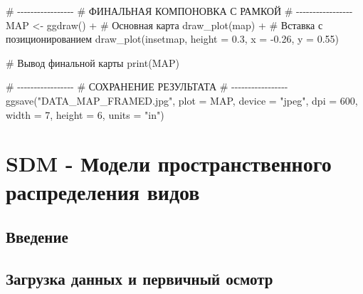 \documentclass[
  letterpaper,
  DIV=11,
  numbers=noendperiod]{scrreprt}
\newenvironment{Shaded}{\begin{snugshade}}{\end{snugshade}}
\newcommand{\AttributeTok}[1]{\textcolor[rgb]{0.40,0.45,0.13}{#1}}
\newcommand{\CommentTok}[1]{\textcolor[rgb]{0.37,0.37,0.37}{#1}}
\newcommand{\DecValTok}[1]{\textcolor[rgb]{0.68,0.00,0.00}{#1}}
\newcommand{\FloatTok}[1]{\textcolor[rgb]{0.68,0.00,0.00}{#1}}
\newcommand{\FunctionTok}[1]{\textcolor[rgb]{0.28,0.35,0.67}{#1}}
\newcommand{\NormalTok}[1]{\textcolor[rgb]{0.00,0.23,0.31}{#1}}
\newcommand{\OtherTok}[1]{\textcolor[rgb]{0.00,0.23,0.31}{#1}}
\newcommand{\SpecialCharTok}[1]{\textcolor[rgb]{0.37,0.37,0.37}{#1}}
\newcommand{\StringTok}[1]{\textcolor[rgb]{0.13,0.47,0.30}{#1}}
\begin{document}
\begin{Shaded}
\begin{Highlighting}[]
\CommentTok{\# {-}{-}{-}{-}{-}{-}{-}{-}{-}{-}{-}{-}{-}{-}{-}{-}{-}}
\CommentTok{\# ФИНАЛЬНАЯ КОМПОНОВКА С РАМКОЙ}
\CommentTok{\# {-}{-}{-}{-}{-}{-}{-}{-}{-}{-}{-}{-}{-}{-}{-}{-}{-}}
\NormalTok{MAP }\OtherTok{\textless{}{-}} \FunctionTok{ggdraw}\NormalTok{() }\SpecialCharTok{+}
  \CommentTok{\# Основная карта}
  \FunctionTok{draw\_plot}\NormalTok{(map) }\SpecialCharTok{+}
  \CommentTok{\# Вставка с позиционированием}
  \FunctionTok{draw\_plot}\NormalTok{(insetmap,}
            \AttributeTok{height =} \FloatTok{0.3}\NormalTok{,}
            \AttributeTok{x =} \SpecialCharTok{{-}}\FloatTok{0.26}\NormalTok{,}
            \AttributeTok{y =} \FloatTok{0.55}\NormalTok{) }

\CommentTok{\# Вывод финальной карты}
\FunctionTok{print}\NormalTok{(MAP)}

\CommentTok{\# {-}{-}{-}{-}{-}{-}{-}{-}{-}{-}{-}{-}{-}{-}{-}{-}{-}}
\CommentTok{\# СОХРАНЕНИЕ РЕЗУЛЬТАТА}
\CommentTok{\# {-}{-}{-}{-}{-}{-}{-}{-}{-}{-}{-}{-}{-}{-}{-}{-}{-}}
\FunctionTok{ggsave}\NormalTok{(}\StringTok{"DATA\_MAP\_FRAMED.jpg"}\NormalTok{, }
       \AttributeTok{plot =}\NormalTok{ MAP,}
       \AttributeTok{device =} \StringTok{"jpeg"}\NormalTok{, }
       \AttributeTok{dpi =} \DecValTok{600}\NormalTok{,}
       \AttributeTok{width =} \DecValTok{7}\NormalTok{,}
       \AttributeTok{height =} \DecValTok{6}\NormalTok{,}
       \AttributeTok{units =} \StringTok{"in"}\NormalTok{)}
\end{Highlighting}
\end{Shaded}


\chapter{SDM - Модели пространственного распределения
видов}\label{sdm---ux43cux43eux434ux435ux43bux438-ux43fux440ux43eux441ux442ux440ux430ux43dux441ux442ux432ux435ux43dux43dux43eux433ux43e-ux440ux430ux441ux43fux440ux435ux434ux435ux43bux435ux43dux438ux44f-ux432ux438ux434ux43eux432}

\section{Введение}\label{ux432ux432ux435ux434ux435ux43dux438ux435-3}

\section{Загрузка данных и первичный
осмотр}\label{ux437ux430ux433ux440ux443ux437ux43aux430-ux434ux430ux43dux43dux44bux445-ux438-ux43fux435ux440ux432ux438ux447ux43dux44bux439-ux43eux441ux43cux43eux442ux440-1}
\end{document}
